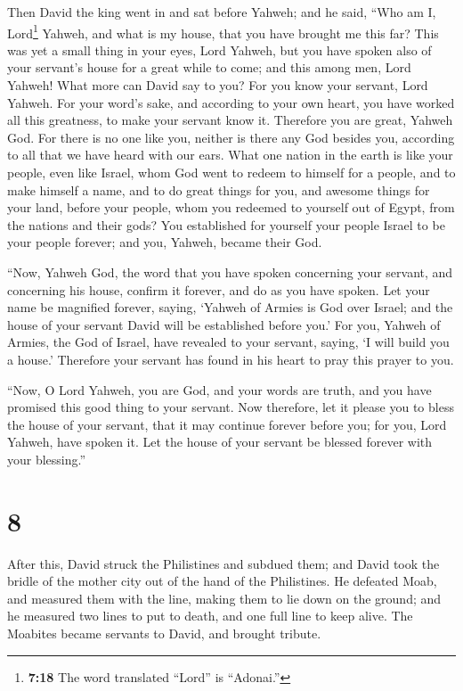  Then David the king went in and sat before Yahweh; and
he said, ``Who am I, Lord\footnote{\textbf{7:18} The word translated
  ``Lord'' is ``Adonai.''} Yahweh, and what is my house, that you have
brought me this far?  This was yet a small thing in your
eyes, Lord Yahweh, but you have spoken also of your servant's house for
a great while to come; and this among men, Lord Yahweh! 
What more can David say to you? For you know your servant, Lord Yahweh.
 For your word's sake, and according to your own heart,
you have worked all this greatness, to make your servant know it.
 Therefore you are great, Yahweh God. For there is no one
like you, neither is there any God besides you, according to all that we
have heard with our ears.  What one nation in the earth
is like your people, even like Israel, whom God went to redeem to
himself for a people, and to make himself a name, and to do great things
for you, and awesome things for your land, before your people, whom you
redeemed to yourself out of Egypt, from the nations and their gods?
 You established for yourself your people Israel to be
your people forever; and you, Yahweh, became their God.

 ``Now, Yahweh God, the word that you have spoken
concerning your servant, and concerning his house, confirm it forever,
and do as you have spoken.  Let your name be magnified
forever, saying, `Yahweh of Armies is God over Israel; and the house of
your servant David will be established before you.'  For
you, Yahweh of Armies, the God of Israel, have revealed to your servant,
saying, `I will build you a house.' Therefore your servant has found in
his heart to pray this prayer to you.

 ``Now, O Lord Yahweh, you are God, and your words are
truth, and you have promised this good thing to your servant.
 Now therefore, let it please you to bless the house of
your servant, that it may continue forever before you; for you, Lord
Yahweh, have spoken it. Let the house of your servant be blessed forever
with your blessing.''

\hypertarget{section-7}{%
\section{8}\label{section-7}}

 After this, David struck the Philistines and subdued
them; and David took the bridle of the mother city out of the hand of
the Philistines.  He defeated Moab, and measured them with
the line, making them to lie down on the ground; and he measured two
lines to put to death, and one full line to keep alive. The Moabites
became servants to David, and brought tribute.

